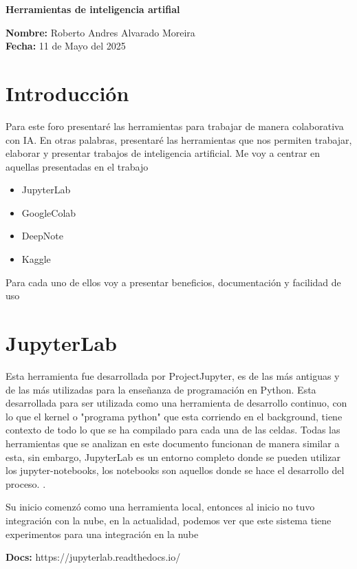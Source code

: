 \documentclass[a4paper,12pt]{article}
\begin{document}
\begin{center}
    \Large \textbf{Herramientas de inteligencia artifial}
\end{center}

\noindent\textbf{Nombre:} Roberto Andres Alvarado Moreira \\
\noindent\textbf{Fecha:} 11 de Mayo del 2025

\section{Introducción}
Para este foro presentaré las herramientas para trabajar de manera
colaborativa con IA. En otras palabras, presentaré las herramientas que nos
permiten trabajar, elaborar y presentar trabajos de inteligencia artificial.
Me voy a centrar en aquellas presentadas en el trabajo
\begin{itemize}
    \item JupyterLab
    \item GoogleColab
    \item DeepNote
    \item Kaggle
\end{itemize}
Para cada uno de ellos voy a presentar beneficios, documentación y facilidad de
uso
\section{JupyterLab}
Esta herramienta fue desarrollada por ProjectJupyter, es de las más antiguas y
de las más utilizadas para la enseñanza de programación en Python. Esta
desarrollada para ser utilizada como una herramienta de
desarrollo continuo, con lo que el kernel o "programa python"
que esta corriendo en el
background, tiene contexto de todo lo que se ha compilado para cada una de las
celdas. Todas las herramientas que se analizan en este documento funcionan de
manera similar a esta, sin embargo, JupyterLab es un entorno completo donde se pueden
utilizar los jupyter-notebooks, los notebooks son aquellos donde se hace el
desarrollo del proceso. \cite{jupyterlab_docs}.

Su inicio comenzó como una herramienta local, entonces al inicio no tuvo
integración con la nube, en la actualidad, podemos ver que este sistema tiene
experimentos para una integración en la nube \cite{jupyter2024}

\textbf{Docs:} https://jupyterlab.readthedocs.io/\cite{jupyterlab_docs}
\end{document}
